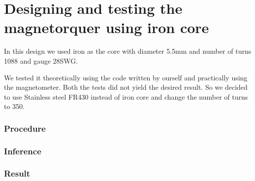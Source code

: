 \chapter{Designing and testing the magnetorquer using iron core}

In this design we used iron as the core with diameter 5.5mm and number of turns 1088 and gauge 28SWG. 

We tested it theoretically using the code written by ourself and practically using the magnetometer. Both the tests did not yield the desired result. So we decided to use Stainless steel FR430 instead of iron core and change the number of turns to 350.


\subsection{Procedure}

\subsection{Inference}

\subsection{Result}
